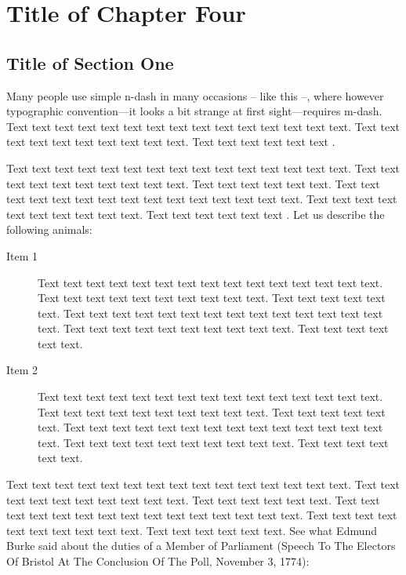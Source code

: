 \chapter{Title of Chapter Four}
\label{chap:four}

\section{Title of Section One}

Many people use simple n-dash in many occasions -- like this --, where however typographic convention---it looks a bit strange at first sight---requires m-dash. Text text text text text text text text text text text text text text text. Text text text text text text text text text text. Text text text text text text \citet{Haufler2006}. 

Text text text text text text text text text text text text text text text. Text text text text text text text text text text. Text text text text text text. Text text text text text text text text text text text text text text text. Text text text text text text text text text text. Text text text text text text \citet{Wells2001}. Let us describe the following animals:

\begin{description}
\item[Item 1] Text text text text text text text text text text text text text text text. Text text text text text text text text text text. Text text text text text text. Text text text text text text text text text text text text text text text. Text text text text text text text text text text. Text text text text text text.
\item[Item 2] Text text text text text text text text text text text text text text text. Text text text text text text text text text text. Text text text text text text. Text text text text text text text text text text text text text text text. Text text text text text text text text text text. Text text text text text text.
\end{description}

Text text text text text text text text text text text text text text text. Text text text text text text text text text text. Text text text text text text. Text text text text text text text text text text text text text text text. Text text text text text text text text text text. Text text text text text text. See what Edmund Burke said about the duties of a Member of Parliament (Speech To The Electors Of Bristol At The Conclusion Of The Poll, November 3, 1774):

